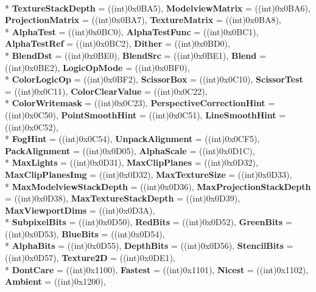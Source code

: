 \begin{DoxyCompactItemize}
\\*
{\bfseries Texture\-Stack\-Depth} = ((int)0x0\-B\-A5), 
{\bfseries Modelview\-Matrix} = ((int)0x0\-B\-A6), 
{\bfseries Projection\-Matrix} = ((int)0x0\-B\-A7), 
{\bfseries Texture\-Matrix} = ((int)0x0\-B\-A8), 
\\*
{\bfseries Alpha\-Test} = ((int)0x0\-B\-C0), 
{\bfseries Alpha\-Test\-Func} = ((int)0x0\-B\-C1), 
{\bfseries Alpha\-Test\-Ref} = ((int)0x0\-B\-C2), 
{\bfseries Dither} = ((int)0x0\-B\-D0), 
\\*
{\bfseries Blend\-Dst} = ((int)0x0\-B\-E0), 
{\bfseries Blend\-Src} = ((int)0x0\-B\-E1), 
{\bfseries Blend} = ((int)0x0\-B\-E2), 
{\bfseries Logic\-Op\-Mode} = ((int)0x0\-B\-F0), 
\\*
{\bfseries Color\-Logic\-Op} = ((int)0x0\-B\-F2), 
{\bfseries Scissor\-Box} = ((int)0x0\-C10), 
{\bfseries Scissor\-Test} = ((int)0x0\-C11), 
{\bfseries Color\-Clear\-Value} = ((int)0x0\-C22), 
\\*
{\bfseries Color\-Writemask} = ((int)0x0\-C23), 
{\bfseries Perspective\-Correction\-Hint} = ((int)0x0\-C50), 
{\bfseries Point\-Smooth\-Hint} = ((int)0x0\-C51), 
{\bfseries Line\-Smooth\-Hint} = ((int)0x0\-C52), 
\\*
{\bfseries Fog\-Hint} = ((int)0x0\-C54), 
{\bfseries Unpack\-Alignment} = ((int)0x0\-C\-F5), 
{\bfseries Pack\-Alignment} = ((int)0x0\-D05), 
{\bfseries Alpha\-Scale} = ((int)0x0\-D1\-C), 
\\*
{\bfseries Max\-Lights} = ((int)0x0\-D31), 
{\bfseries Max\-Clip\-Planes} = ((int)0x0\-D32), 
{\bfseries Max\-Clip\-Planes\-Img} = ((int)0x0\-D32), 
{\bfseries Max\-Texture\-Size} = ((int)0x0\-D33), 
\\*
{\bfseries Max\-Modelview\-Stack\-Depth} = ((int)0x0\-D36), 
{\bfseries Max\-Projection\-Stack\-Depth} = ((int)0x0\-D38), 
{\bfseries Max\-Texture\-Stack\-Depth} = ((int)0x0\-D39), 
{\bfseries Max\-Viewport\-Dims} = ((int)0x0\-D3\-A), 
\\*
{\bfseries Subpixel\-Bits} = ((int)0x0\-D50), 
{\bfseries Red\-Bits} = ((int)0x0\-D52), 
{\bfseries Green\-Bits} = ((int)0x0\-D53), 
{\bfseries Blue\-Bits} = ((int)0x0\-D54), 
\\*
{\bfseries Alpha\-Bits} = ((int)0x0\-D55), 
{\bfseries Depth\-Bits} = ((int)0x0\-D56), 
{\bfseries Stencil\-Bits} = ((int)0x0\-D57), 
{\bfseries Texture2\-D} = ((int)0x0\-D\-E1), 
\\*
{\bfseries Dont\-Care} = ((int)0x1100), 
{\bfseries Fastest} = ((int)0x1101), 
{\bfseries Nicest} = ((int)0x1102), 
{\bfseries Ambient} = ((int)0x1200), 

\end{DoxyCompactItemize}
